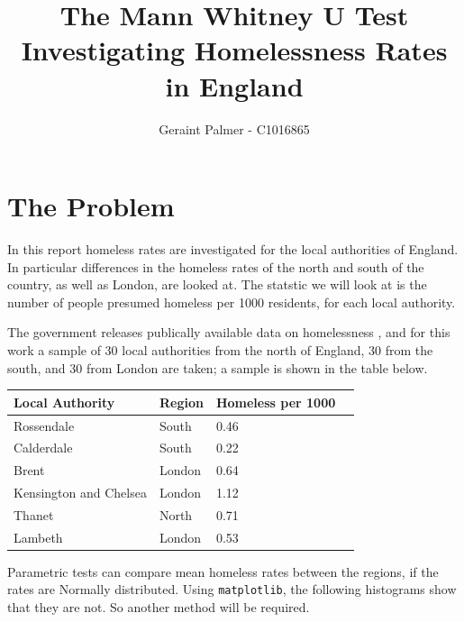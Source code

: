 \documentclass{article}
\title{The Mann Whitney U Test \\ \large Investigating Homelessness Rates in England}
\author{Geraint Palmer - C1016865}
\date{}
\begin{document}
\maketitle

\section{The Problem}
In this report homeless rates are investigated for the local authorities of
England.
In particular differences in the homeless rates of the north and south of the
country, as well as London, are looked at.
The statstic we will look at is the number of people presumed homeless per 1000
residents, for each local authority.

The government releases publically available data on homelessness \cite{data},
and for this work a sample of 30 local authorities from the north of England, 30
from the south, and 30 from London are taken; a sample is shown in the table
below.

\begin{table}[h]
\centering
\footnotesize{
\begin{tabular}{lllr}
\toprule
         Local Authority &  Region &  Homeless per 1000 \\
\midrule
              Rossendale &   South &               0.46 \\
              Calderdale &   South &               0.22 \\
                   Brent &  London &               0.64 \\
  Kensington and Chelsea &  London &               1.12 \\
                  Thanet &   North &               0.71 \\
                 Lambeth &  London &               0.53 \\
\bottomrule
\end{tabular}
}
\end{table}

Parametric tests can compare mean homeless rates between the regions, if the
rates are Normally distributed.
Using \texttt{matplotlib}, the following histograms show that they are not.
So another method will be required.
\end{document}
